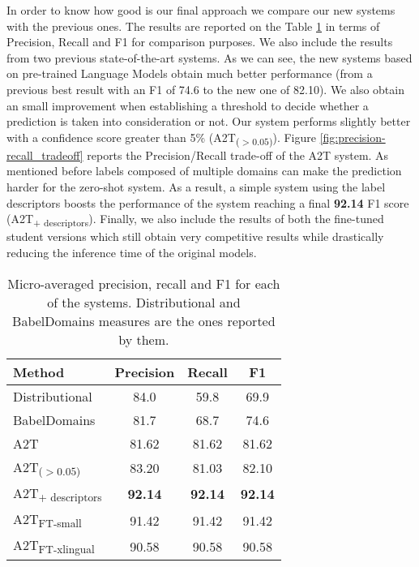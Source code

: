\documentclass[11pt]{article}
\begin{document}
In order to know how good is our final approach we compare our new systems with the previous ones. The results are reported on the Table \ref{tab:sota} in terms of Precision, Recall and F1 for comparison purposes. We also include the results from two previous state-of-the-art systems. As we can see, the new systems based on pre-trained Language Models obtain much better performance (from a previous best result with an F1 of 74.6 to the new one of 82.10). We also obtain an small improvement when
establishing a threshold to decide whether a prediction is taken into consideration or not. Our system performs slightly better with a confidence score greater than 5\%  (A2T\textsubscript{($> 0.05$)}). Figure \ref{fig:precision-recall_tradeoff} reports the Precision/Recall trade-off of the A2T system. As mentioned before labels composed of multiple domains can make the prediction harder for the zero-shot system. As a result, a simple system using the label descriptors boosts the performance of the system reaching a final \textbf{92.14} F1 score (A2T\textsubscript{+ descriptors}). Finally, we also include the results of both the  fine-tuned student versions which still obtain very competitive results while drastically reducing the inference time of the original models.

\begin{table}[!ht]
    \centering
    \begin{tabular}{l|ccc}
    \toprule
        Method & Precision & Recall & F1 \\
    \midrule
        Distributional & 84.0 & 59.8 & 69.9 \\
        BabelDomains & 81.7 & 68.7 & 74.6 \\
    \midrule
        A2T & 81.62 & 81.62 & 81.62 \\
        A2T\textsubscript{($> 0.05$)} & 83.20 & 81.03 & 82.10 \\
        A2T\textsubscript{+ descriptors} & \textbf{92.14} & \textbf{92.14} & \textbf{92.14} \\
    \midrule
        A2T\textsubscript{FT-small} & 91.42 & 91.42 & 91.42 \\
        A2T\textsubscript{FT-xlingual} & 90.58 & 90.58 & 90.58 \\
    \bottomrule
    \end{tabular}
    \caption{Micro-averaged precision, recall and F1 for each of the systems. Distributional \cite{camacho2016} and BabelDomains \cite{camacho2017} measures are the ones reported by them.}
    \label{tab:sota}
\end{table}
\end{document}
